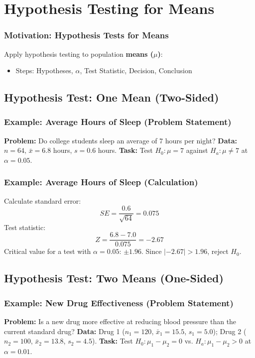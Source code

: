 \documentclass[handout]{beamer}
\begin{document}
\section{Hypothesis Testing for Means}



\begin{frame}
\frametitle{Motivation: Hypothesis Tests for Means}
Apply hypothesis testing to population \textbf{means ($\mu$)}:
\begin{itemize}
\item Steps: Hypotheses, $\alpha$, Test Statistic, Decision, Conclusion
\end{itemize}
\end{frame}

\subsection{Hypothesis Test: One Mean (Two-Sided)}

\begin{frame}
\frametitle{Example: Average Hours of Sleep (Problem Statement)}
\textbf{Problem:} Do college students sleep an average of 7 hours per night? \newline
\textbf{Data:} $n=64$, $\bar{x}=6.8$ hours, $s=0.6$ hours. \newline
\textbf{Task:} Test $H_0: \mu = 7$ against $H_a: \mu \neq 7$ at $\alpha=0.05$.
\end{frame}

\begin{frame}
\frametitle{Example: Average Hours of Sleep (Calculation)}
Calculate standard error:
\[ SE = \frac{0.6}{\sqrt{64}} = 0.075 \]
Test statistic:
\[ Z = \frac{6.8-7.0}{0.075} = -2.67 \]
Critical value for a test with $\alpha=0.05$: $\pm1.96$.\newline 
Since $|-2.67| > 1.96$, reject $H_0$.
\end{frame}

\subsection{Hypothesis Test: Two Means (One-Sided)}

\begin{frame}
\frametitle{Example: New Drug Effectiveness (Problem Statement)}
\textbf{Problem:} Is a new drug more effective at reducing blood pressure than the current standard drug? \newline
\textbf{Data:} Drug 1 ($n_1=120$, $\bar{x}_1=15.5$, $s_1=5.0$); Drug 2 ($n_2=100$, $\bar{x}_2=13.8$, $s_2=4.5$). \newline
\textbf{Task:} Test $H_0: \mu_1 - \mu_2 = 0$ vs. $H_a: \mu_1 - \mu_2 > 0$ at $\alpha=0.01$.
\end{frame}
\end{document}
